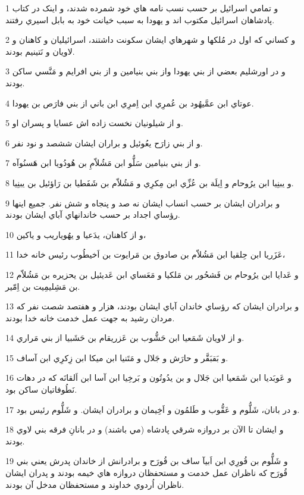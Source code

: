 \par 1 و تمامي اسرائيل بر حسب نسب نامه هاي خود شمرده شدند، و اينک در کتاب پادشاهان اسرائيل مکتوب اند و يهودا به سبب خيانت خود به بابل اسيري رفتند.
\par 2 و کساني که اول در مُلکها و شهرهاي ايشان سکونت داشتند، اسرائيليان و کاهنان و لاويان و نَتينيم بودند.
\par 3 و در اورشليم بعضي از بني يهودا واز بني بنيامين و از بني افرايم و مَنَّسي ساکن بودند.
\par 4 عوتاي ابن عمَّيهُود بن عُمرِي ابن اِمرِي ابن باني از بني فارَص بن يهودا.
\par 5 و از شيلونيان نخست زاده اش عسايا و پسران او.
\par 6 و از بني زارَح يعُوئيل و براران ايشان ششصد و نود نفر.
\par 7 و از بني بنيامين سَلُّو ابن مَشُلاّمِ بن هُودُويا ابن هَسنُوآه.
\par 8 و يبنِيا ابن يرُوحام و اِيلَة بن عُزِّي ابن مِکرِي و مَشُلاّم بن شَفَطيا بن رَاؤئيل بن يبنِيا.
\par 9 و برادران ايشان بر حسب انساب ايشان نه صد و پنجاه و شش نفر. جميع اينها رؤساي اجداد بر حسب خاندانهاي آباي ايشان بودند.
\par 10 و از کاهنان، يدَعيا و يهُوياريب و ياکين،
\par 11 عَزَريا ابن حِلقيا ابن مَشُلاّم بن صادوق بن مَرايوت بن اَخيطُوب رئيس خانه خدا،
\par 12 و عَدايا ابن يرُوحام بن فَشحُور بن مَلکيا و مَعَساي ابن عَديئيل بن يحزيره بن مَشُلاّم بن مَشِليمِيت بن اِمّير.
\par 13 و برادران ايشان که رؤساي خاندان آباي ايشان بودند، هزار و هفتصد شصت نفر که مردان رشيد به جهت عمل خدمت خانه خدا بودند.
\par 14 و از لاويان شَمَعيا ابن حَشُّوب بن عَزريقام بن حَشَبيا از بني مَراري.
\par 15 و بَقبَقَّر و حارَش و جَلال و مَتَنيا ابن ميکا ابن زِکرِي ابن آساف.
\par 16 و عَوبَديا ابن شَمَعيا ابن جَلال و بن يدُوتُون و بَرخِيا ابن آسا ابن اَلقانَه که در دهات نَطُوفاتيان ساکن بود.
\par 17 و در بانان، شَلُّوم و عَقُّوب و طَلمُون و اَخِيمان و برادران ايشان. و شَلُّوم رئيس بود.
\par 18 و ايشان تا الآن بر دروازه شرقي پادشاه (مي باشند) و در بانانِ فرقه بني لاوي بودند.
\par 19 و شَلُّوم بن قُورِي ابن اَبيآ ساف بن قُورَح و برادرانش از خاندان پدرش يعني بني قُورَح که ناظران عمل خدمت و مستحفظان دروازه هاي خيمه بودند و پدران ايشان ناظران اُردوي خداوند و مستحفظان مدخل آن بودند.
